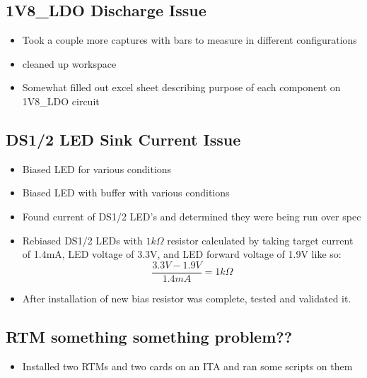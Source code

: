 \documentclass{article}
\begin{document}
\subsection*{1V8\_LDO Discharge Issue}
\begin{itemize}
    \item Took a couple more captures with bars to measure in different configurations
    \item cleaned up workspace
    \item Somewhat filled out excel sheet describing purpose of each component on 1V8\_LDO circuit
\end{itemize}
\subsection*{DS1/2 LED Sink Current Issue}
\begin{itemize}
    \item Biased LED for various conditions
    \item Biased LED with buffer with various conditions
    \item Found current of DS1/2 LED's and determined they were being run over spec
    \item Rebiased DS1/2 LEDs with $1k\Omega$ resistor calculated by taking target current of 1.4mA, LED voltage of 3.3V, and LED forward voltage of 1.9V like so:
    \begin{equation}
        \frac{3.3V - 1.9V}{1.4mA}  = 1k\Omega
    \end{equation}
    \item After installation of new bias resistor was complete, tested and validated it.
\end{itemize}
\subsection*{RTM something something problem??}
\begin{itemize}
    \item Installed two RTMs and two cards on an ITA and ran some scripts on them
\end{itemize}
\end{document}
